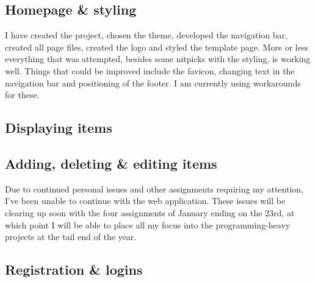 \documentclass{article}
\begin{document}
  \subsection{Homepage \& styling}
    I have created the project, chosen the theme, developed the navigation bar, created all page files, created the logo and styled the template page. More or less everything that was attempted, besides some nitpicks with the styling, is working well. Things that could be improved include the favicon, changing text in the navigation bar and positioning of the footer. I am currently using workarounds for these. \cite{CarlosCSS}
  \subsection{Displaying items}
  \subsection{Adding, deleting \& editing items}
    Due to continued personal issues and other assignments requiring my attention, I’ve been unable to continue with the web application. These issues will be clearing up soon with the four assignments of January ending on the 23rd, at which point I will be able to place all my focus into the programming-heavy projects at the tail end of the year.
  \subsection{Registration \& logins}
    
\printbibliography[heading=bibnumbered]
\end{document}
